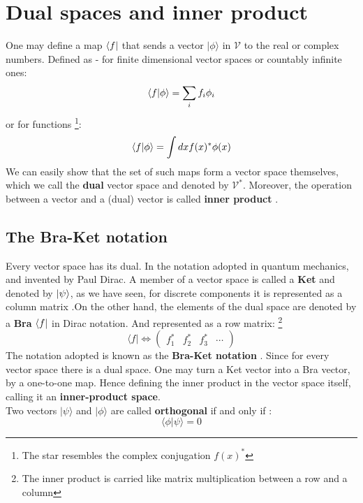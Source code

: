 \section{Dual spaces and inner product}
One may define a map $\langle f\arrowvert$ that sends a vector $\lvert \phi \rangle$ in $ \mathcal{V}$ to the real or complex numbers. Defined as - for finite dimensional vector spaces or countably infinite ones:
\begin{equation}
\langle f\arrowvert \phi \rangle = \sum_i f_i \phi_i 
\end{equation}
or for functions \footnote{ The star resembles the complex conjugation $f(x)^*$}:
\begin{equation}
\langle f\arrowvert \phi \rangle = \int dx f(x)^* \phi(x)
\end{equation}
We can easily show that the set of such maps  form a vector space themselves, which we call the \textbf{dual} vector space and denoted by $ \mathcal{V}^*$. Moreover, the operation between a vector and a (dual) vector is called \textbf{inner product }. \\
\subsection{The Bra-Ket notation}
Every vector space has its dual. In the notation adopted in quantum mechanics, and invented by Paul Dirac. A member of a vector space is called a \textbf{Ket} and denoted by $ \arrowvert \psi \rangle$, as we have seen, for discrete components it is represented as a column matrix .On the other hand, the elements of the dual space are denoted by a \textbf{Bra} $\langle f \arrowvert$ in Dirac notation. And represented as a row matrix: \footnote{ The inner product is carried like matrix multiplication between a row and a column}
   \begin{equation}
 \langle f  \lvert \Leftrightarrow \left( \begin{array}{cccc}
   f_1^*& f_2^*& f_3^*&\cdots
   \end{array}\right) 
   \end{equation}
   The notation adopted is known as the \textbf{Bra-Ket notation }. Since for every vector space there is a dual space. One may turn a Ket vector into a Bra vector, by a one-to-one map. Hence defining the inner product in the vector space itself, calling it an \textbf{inner-product space}.\\
	Two vectors  $\lvert \psi \rangle$ and $\lvert \phi \rangle$ are called \textbf{orthogonal} if and only if :
   	\[
   	\langle \phi| \psi \rangle = 0 
   	\]
